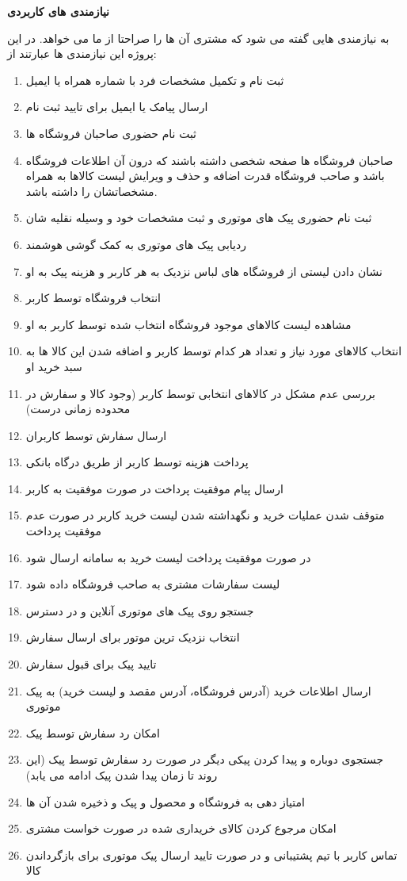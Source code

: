 \documentclass[12pt,a4paper]{article}
\begin{document}
	\textbf{نیازمندی های کاربردی} 
	
	
	به نیازمندی هایی گفته می شود که مشتری آن ها را صراحتا از ما می خواهد. در این پروژه این نیازمندی ها عبارتند از:
\begin{enumerate}
	\item
	ثبت نام و تکمیل مشخصات فرد با شماره همراه یا ایمیل
	\item
	ارسال پیامک یا ایمیل برای تایید ثبت نام
	\item
	ثبت نام حضوری صاحبان فروشگاه ها
	\item
	صاحبان فروشگاه ها صفحه شخصی داشته باشند که درون آن اطلاعات فروشگاه باشد و صاحب فروشگاه قدرت اضافه و حذف و ویرایش لیست کالاها به همراه مشخصاتشان را داشته باشد.
	\item
	ثبت نام حضوری پیک های موتوری و ثبت مشخصات خود و وسیله نقلیه شان
\item
ردیابی پیک های موتوری به کمک گوشی هوشمند
\item
نشان دادن لیستی از فروشگاه های لباس نزدیک به هر کاربر و هزینه پیک به او
\item
انتخاب فروشگاه توسط کاربر
\item
مشاهده لیست کالاهای موجود فروشگاه انتخاب شده توسط کاربر به او
\item
انتخاب کالاهای مورد نیاز و تعداد هر کدام توسط کاربر و اضافه شدن این کالا ها به سبد خرید او
\item
بررسی عدم مشکل در کالاهای انتخابی توسط کاربر (وجود کالا و سفارش در محدوده زمانی درست)
\item
ارسال سفارش توسط کاربران
\item
پرداخت هزینه توسط کاربر از طریق درگاه بانکی
\item
ارسال پیام موفقیت پرداخت در صورت موفقیت به کاربر
\item
متوقف شدن عملیات خرید و نگهداشته شدن لیست خرید کاربر در صورت عدم موفقیت پرداخت
\item
در صورت موفقیت پرداخت لیست خرید به سامانه ارسال شود
\item
لیست سفارشات مشتری به صاحب فروشگاه داده شود
\item
جستجو روی پیک های موتوری آنلاین و در دسترس 
\item
انتخاب نزدیک ترین موتور برای ارسال سفارش
\item
تایید پیک برای قبول سفارش
\item
ارسال اطلاعات خرید (آدرس فروشگاه، آدرس مقصد و لیست خرید) به پیک موتوری
\item
	امکان رد سفارش توسط پیک
\item
جستجوی دوباره و پیدا کردن پیکی دیگر در صورت رد سفارش توسط پیک (این روند تا زمان پیدا شدن پیک ادامه می یابد)
\item
امتیاز دهی به فروشگاه و محصول و پیک و ذخیره شدن آن ها
\item
امکان مرجوع کردن کالای خریداری شده در صورت خواست مشتری
\item
تماس کاربر با تیم پشتیبانی و در صورت تایید ارسال پیک موتوری برای بازگرداندن کالا
	
\end{enumerate}
\end{document}
